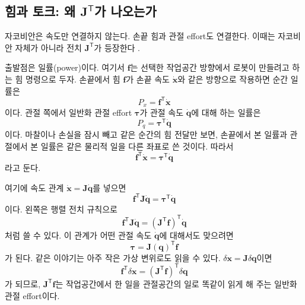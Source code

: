 \subsection{힘과 토크: 왜 \texorpdfstring{\(\bm{J}^{\mathsf{T}}\)}{J transpose}가 나오는가}
\label{sec:robotics-force-torque-jacobian-transpose}

자코비안은 속도만 연결하지 않는다.
손끝 힘과 관절 effort도 연결한다.
%
이때는 자코비안 자체가 아니라 전치 \(\bm{J}^{\mathsf{T}}\)가 등장한다 \cite{lynchpark2017modernrobotics}.

출발점은 일률(power)이다.
여기서 \(\bm{f}\)는 선택한 작업공간 방향에서 로봇이 만들려고 하는 힘 명령으로 두자.
%
손끝에서 힘 \(\bm{f}\)가 손끝 속도 \(\dot{\bm{x}}\)와 같은 방향으로 작용하면 순간 일률은
\begin{equation}
  P_x
  =
  \bm{f}^{\mathsf{T}}\dot{\bm{x}}
\end{equation}
이다.
관절 쪽에서 일반화 관절 effort \(\bm{\tau}\)가 관절 속도 \(\dot{\bm{q}}\)에 대해 하는 일률은
%
\begin{equation}
  P_q
  =
  \bm{\tau}^{\mathsf{T}}\dot{\bm{q}}
\end{equation}
이다.
마찰이나 손실을 잠시 빼고 같은 순간의 힘 전달만 보면, 손끝에서 본 일률과 관절에서 본 일률은 같은 물리적 일을 다른 좌표로 쓴 것이다.
따라서
\begin{equation}
  \bm{f}^{\mathsf{T}}\dot{\bm{x}}
  =
  \bm{\tau}^{\mathsf{T}}\dot{\bm{q}}
\end{equation}
라고 둔다.

여기에 속도 관계 \(\dot{\bm{x}}=\bm{J}\dot{\bm{q}}\)를 넣으면
\begin{equation}
  \bm{f}^{\mathsf{T}}\bm{J}\dot{\bm{q}}
  =
  \bm{\tau}^{\mathsf{T}}\dot{\bm{q}}
\end{equation}
이다.
왼쪽은 행렬 전치 규칙으로
\[
  \bm{f}^{\mathsf{T}}\bm{J}\dot{\bm{q}}
  =
  (\bm{J}^{\mathsf{T}}\bm{f})^{\mathsf{T}}\dot{\bm{q}}
\]
처럼 쓸 수 있다.
이 관계가 어떤 관절 속도 \(\dot{\bm{q}}\)에 대해서도 맞으려면
\begin{equation}
  \bm{\tau}
  =
  \bm{J}(\bm{q})^{\mathsf{T}}\bm{f}
  \label{eq:jacobian-transpose-foundation}
\end{equation}
가 된다.
같은 이야기는 아주 작은 가상 변위로도 읽을 수 있다.
\(\delta\bm{x}=\bm{J}\delta\bm{q}\)이면
\[
  \bm{f}^{\mathsf{T}}\delta\bm{x}
  =
  (\bm{J}^{\mathsf{T}}\bm{f})^{\mathsf{T}}\delta\bm{q}
\]
가 되므로, \(\bm{J}^{\mathsf{T}}\bm{f}\)는 작업공간에서 한 일을 관절공간의 일로 똑같이 읽게 해 주는 일반화 관절 effort이다.

